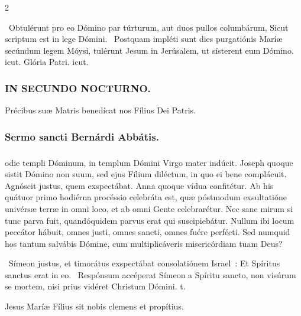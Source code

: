 \documentclass[9pt,twoside]{extarticle}
\begin{document}
\begin{multicols}{2}
\begin{tightlist}{}
\item {}~Obtulérunt pro eo Dómino par túrturum, aut duos pullos columbárum, \textred{*} Sicut scriptum est in lege Dómini. ~Postquam impléti sunt dies purgatiónis Maríæ secúndum legem Móysi, tulérunt Jesum in Jerúsalem, ut sísterent eum Dómino. icut. Glória Patri. icut.
\end{tightlist}

\subsubsection*{\center \textsc{IN SECUNDO NOCTURNO.}}
\begin{tightlist}{}
\item {\small {} Précibus suæ Matris benedícat nos Fílius Dei Patris.}
\end{tightlist}
\subsubsection*{\center Sermo sancti Bernárdi Abbátis.}
\subsubsection*{\center {}}
odie templi Dóminum, in templum Dómini Virgo mater indúcit. Joseph quoque sistit Dómino non suum, sed ejus Fílium diléctum, in quo ei bene complácuit. Agnóscit justus, quem exspectábat. Anna quoque vídua confitétur. Ab his quátuor primo hodiérna procéssio celebráta est, quæ póstmodum exsultatióne univérsæ terræ in omni loco, et ab omni Gente celebrarétur. Nec sane mirum si tunc parva fuit, quandóquidem parvus erat qui suscipiebátur. Nullum ibi locum peccátor hábuit, omnes justi, omnes sancti, omnes fuére perfécti. Sed numquid hos tantum salvábis Dómine, cum multiplicáveris misericórdiam tuam Deus?

\begin{tightlist}{}
\item {}~Símeon justus, et timorátus exspectábat consolatiónem Israel~: \textred{*} Et Spíritus sanctus erat in eo. ~Respónsum accéperat Símeon a Spíritu sancto, non visúrum se mortem, nisi prius vidéret Christum Dómini. t.
\item {\small {} Jesus Maríæ Fílius sit nobis clemens et propítius.}
\end{tightlist}


\end{multicols}
\end{document}
